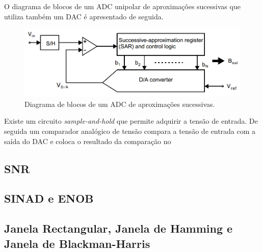 \documentclass[11pt]{article}
\numberwithin{equation}{section}
\begin{document}
O diagrama de blocos de um ADC unipolar de aproximações sucessivas que utiliza também um DAC é apresentado de seguida.
	
\pagebreak	

\begin{figure}[h]
	\centering
	\includegraphics[keepaspectratio=true, scale=0.30]{./teoricas/SAR_2}
	\caption{Diagrama de blocos de um ADC de aproximações sucessivas.}
	\vspace{-0.8em}
\end{figure}

Existe um circuito \textit{sample-and-hold} que permite adquirir a tensão de entrada. De seguida um comparador analógico de tensão compara a tensão de entrada com a saída do DAC e coloca o resultado da comparação no 

\subsection{SNR}
\subsection{SINAD e ENOB}
\subsection{Janela Rectangular, Janela de Hamming e Janela de Blackman-Harris}
\end{document}

